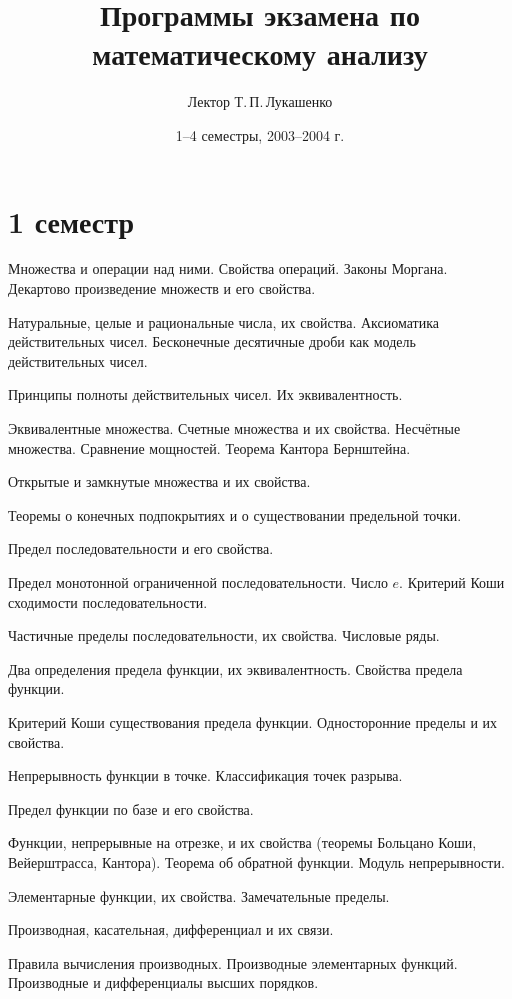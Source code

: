 \documentclass[a4paper]{article}
\title{Программы экзамена по математическому анализу}
\author{Лектор Т.\,П.\,Лукашенко}
\date{1--4 семестры, 2003--2004 г.}
\begin{document}
\maketitle

\section*{1 семестр}

\begin{nums}{0}
\item Множества и операции над ними. Свойства операций. Законы Моргана. Декартово  произведение множеств и его свойства.
\item Натуральные, целые и рациональные числа, их свойства. Аксиоматика действительных чисел. Бесконечные десятичные
дроби как модель действительных чисел.
\item Принципы полноты действительных чисел. Их эквивалентность.
\item Эквивалентные множества. Счетные множества и их свойства. Несчётные множества. Сравнение мощностей. Теорема Кантора Бернштейна.
\item Открытые и замкнутые множества и их свойства.
\item Теоремы о конечных подпокрытиях и о существовании предельной точки.
\item Предел последовательности и его свойства.
\item Предел монотонной ограниченной последовательности. Число $e$. Критерий Коши сходимости последовательности.
\item Частичные пределы последовательности, их свойства. Числовые ряды.
\item Два определения предела функции, их эквивалентность. Свойства предела функции.
\item Критерий Коши существования предела функции. Односторонние пределы и их свойства.
\item Непрерывность функции в точке. Классификация точек разрыва.
\item Предел функции по базе и его свойства.
\item Функции, непрерывные на отрезке, и их свойства (теоремы Больцано Коши, Вейерштрасса, Кантора). Теорема об обратной функции.
Модуль непрерывности.
\item Элементарные функции, их свойства. Замечательные пределы.
\item Производная, касательная, дифференциал и их связи.
\item Правила вычисления производных. Производные элементарных функций. Производные и дифференциалы высших порядков.

\end{nums}
\end{document}
